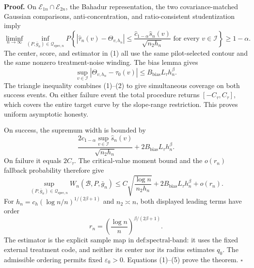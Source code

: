 \textbf{Proof.}
On \(\mathcal E_{1n}\cap\mathcal E_{2n}\), the Bahadur representation, the two covariance-matched Gaussian comparisons, anti-concentration, and ratio-consistent studentization imply
\[
 \liminf_{n\to\infty}\inf_{(P,\bar g_n)\in\mathcal Q_{\mathrm{spec},n}}
 P\left\{
 |\widehat\tau_n(v)-\Theta_{v,h_n}|
 \le\frac{\widehat c_{1-\alpha}\widehat s_n(v)}{\sqrt{n_2h_n}}
 \text{ for every }v\in\mathcal I
 \right\}\ge1-\alpha. \tag{1}
\]
The center, score, and estimator in (1) all use the same pilot-selected contour and the same nonzero treatment-noise winding.  The bias lemma gives
\[
 \sup_{v\in\mathcal I}|\Theta_{v,h_n}-\tau_0(v)|
 \le B_{\mathrm{bias}}L_\tau h_n^\beta. \tag{2}
\]
The triangle inequality combines (1)--(2) to give simultaneous coverage on both success events.  On either failure event the total procedure returns \([-C_\tau,C_\tau]\), which covers the entire target curve by the slope-range restriction.  This proves uniform asymptotic honesty.

On success, the supremum width is bounded by
\[
 \frac{2\widehat c_{1-\alpha}\sup_{v\in\mathcal I}\widehat s_n(v)}
 {\sqrt{n_2h_n}}
 +2B_{\mathrm{bias}}L_\tau h_n^\beta. \tag{3}
\]
On failure it equals \(2C_\tau\).  The critical-value moment bound and the \(o(r_n)\) fallback probability therefore give
\[
 \sup_{(P,\bar g_n)\in\mathcal Q_{\mathrm{spec},n}}
 W_n(\mathcal B,P,\bar g_n)
 \le C\sqrt{\frac{\log n}{n_2h_n}}
 +2B_{\mathrm{bias}}L_\tau h_n^\beta+o(r_n). \tag{4}
\]
For \(h_n=c_h(\log n/n)^{1/(2\beta+1)}\) and \(n_2\asymp n\), both displayed leading terms have order
\[
 r_n=\left(\frac{\log n}{n}\right)^{\beta/(2\beta+1)}. \tag{5}
\]
The estimator is the explicit sample map in \(\text{def:spectral-band}\): it uses the fixed external treatment code, and neither its center nor its radius estimates \(q_0\).  The admissible ordering permits fixed \(\varepsilon_0>0\).  Equations (1)--(5) prove the theorem. \(\square\)